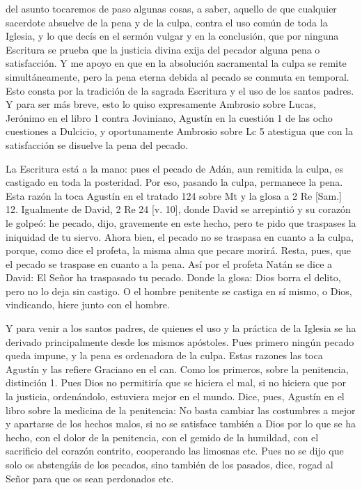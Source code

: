del asunto tocaremos de paso algunas cosas, a saber, aquello de que cualquier sacerdote absuelve de la pena y de la culpa, contra el uso común de toda la Iglesia, y lo que decís en el sermón vulgar y en la conclusión, que por ninguna Escritura se prueba que la justicia divina exija del pecador alguna pena o satisfacción. Y me apoyo en que en la absolución sacramental la culpa se remite simultáneamente, pero la pena eterna debida al pecado se conmuta en temporal. Esto consta por la tradición de la sagrada Escritura y el uso de los santos padres. Y para ser más breve, esto lo quiso expresamente Ambrosio sobre Lucas, Jerónimo en el libro 1 contra Joviniano, Agustín en la cuestión 1 de las ocho cuestiones a Dulcicio, y oportunamente Ambrosio sobre Lc 5 atestigua que con la satisfacción se disuelve la pena del pecado.

La Escritura está a la mano: pues el pecado de Adán, aun remitida la culpa, es castigado en toda la posteridad. Por eso, pasando la culpa, permanece la pena. Esta razón la toca Agustín en el tratado 124 sobre Mt y la glosa a 2 Re [Sam.] 12. Igualmente de David, 2 Re 24 [v. 10], donde David se arrepintió y su corazón le golpeó: he pecado, dijo, gravemente en este hecho, pero te pido que traspases la iniquidad de tu siervo. Ahora bien, el pecado no se traspasa en cuanto a la culpa, porque, como dice el profeta, la misma alma que pecare morirá. Resta, pues, que el pecado se traspase en cuanto a la pena. Así por el profeta Natán se dice a David: El Señor ha traspasado tu pecado. Donde la glosa: Dios borra el delito, pero no lo deja sin castigo. O el hombre penitente se castiga en sí mismo, o Dios, vindicando, hiere junto con el hombre.

Y para venir a los santos padres, de quienes el uso y la práctica de la Iglesia se ha derivado principalmente desde los mismos apóstoles. Pues primero ningún pecado queda impune, y la pena es ordenadora de la culpa. Estas razones las toca Agustín y las refiere Graciano en el can. Como los primeros, sobre la penitencia, distinción 1. Pues Dios no permitiría que se hiciera el mal, si no hiciera que por la justicia, ordenándolo, estuviera mejor en el mundo. Dice, pues, Agustín en el libro sobre la medicina de la penitencia: No basta cambiar las costumbres a mejor y apartarse de los hechos malos, si no se satisface también a Dios por lo que se ha hecho, con el dolor de la penitencia, con el gemido de la humildad, con el sacrificio del corazón contrito, cooperando las limosnas etc. Pues no se dijo que solo os abstengáis de los pecados, sino también de los pasados, dice, rogad al Señor para que os sean perdonados etc.

